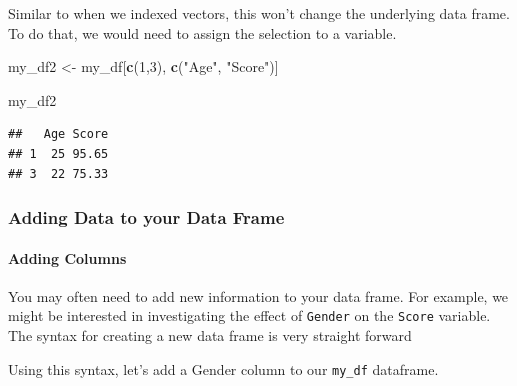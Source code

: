 \documentclass[
]{book}
\newenvironment{Shaded}{\begin{snugshade}}{\end{snugshade}}
\newcommand{\CommentTok}[1]{\textcolor[rgb]{0.56,0.35,0.01}{\textit{#1}}}
\newcommand{\DecValTok}[1]{\textcolor[rgb]{0.00,0.00,0.81}{#1}}
\newcommand{\FunctionTok}[1]{\textcolor[rgb]{0.13,0.29,0.53}{\textbf{#1}}}
\newcommand{\NormalTok}[1]{#1}
\newcommand{\OtherTok}[1]{\textcolor[rgb]{0.56,0.35,0.01}{#1}}
\newcommand{\SpecialCharTok}[1]{\textcolor[rgb]{0.81,0.36,0.00}{\textbf{#1}}}
\newcommand{\StringTok}[1]{\textcolor[rgb]{0.31,0.60,0.02}{#1}}
\begin{document}
Similar to when we indexed vectors, this won't change the underlying data frame. To do that, we would need to assign the selection to a variable.

\begin{Shaded}
\begin{Highlighting}[]
\NormalTok{my\_df2 }\OtherTok{\textless{}{-}}\NormalTok{ my\_df[}\FunctionTok{c}\NormalTok{(}\DecValTok{1}\NormalTok{,}\DecValTok{3}\NormalTok{), }\FunctionTok{c}\NormalTok{(}\StringTok{"Age"}\NormalTok{, }\StringTok{"Score"}\NormalTok{)]}

\NormalTok{my\_df2}
\end{Highlighting}
\end{Shaded}

\begin{verbatim}
##   Age Score
## 1  25 95.65
## 3  22 75.33
\end{verbatim}

\hypertarget{adding-data-to-your-data-frame}{%
\subsubsection{Adding Data to your Data Frame}\label{adding-data-to-your-data-frame}}

\hypertarget{adding-columns}{%
\paragraph{Adding Columns}\label{adding-columns}}

You may often need to add new information to your data frame. For example, we might be interested in investigating the effect of \texttt{Gender} on the \texttt{Score} variable. The syntax for creating a new data frame is very straight forward

\begin{Shaded}
\end{Shaded}

Using this syntax, let's add a Gender column to our \texttt{my\_df} dataframe.

\begin{Shaded}
\end{Shaded}
\end{document}

